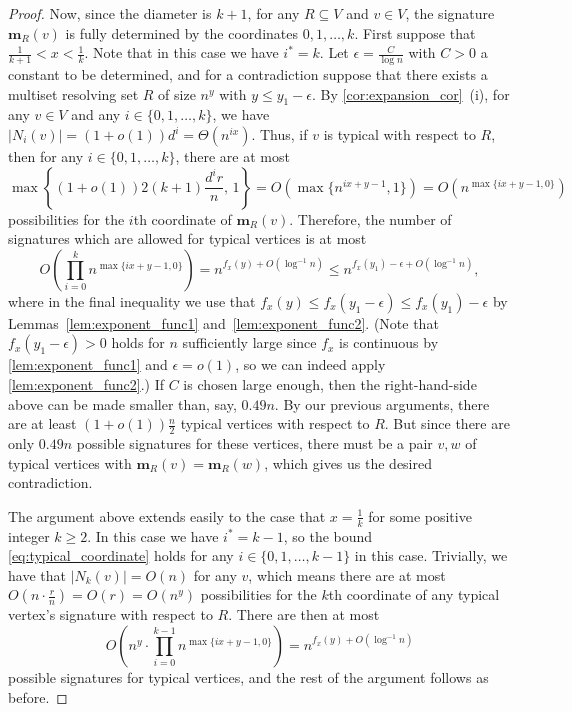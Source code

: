 \documentclass[12pt]{article}
\theoremstyle{definition}
\theoremstyle{remark}
\theoremstyle{remark}
\numberwithin{theorem}{section}
\begin{document}
\begin{proof}
Now, since the diameter is $k+1$, for any $R \subseteq V$ and $v \in V$, the signature $\bm{m}_{R}(v)$ is fully determined by the coordinates $0,1,\dots,k$. First suppose that $\frac{1}{k+1} < x < \frac{1}{k}$. Note that in this case we have $i^{*} = k$. Let $\epsilon = \frac{C}{\log n}$ with $C>0$ a constant to be determined, and for a contradiction suppose that there exists a multiset resolving set $R$ of size $n^{y}$ with $y \leq y_{1} - \epsilon$. By \cref{cor:expansion_cor}~(i), for any $v \in V$ and any $i \in \{ 0,1,\dots,k \}$, we have $|N_{i}(v)| = (1+o(1))d^{i} = \Theta(n^{ix}).$ Thus, if $v$ is typical with respect to $R$, then for any $i \in \{ 0,1,\dots,k \}$, there are at most
\begin{equation}\label{eq:typical_coordinate}
	\max\left\{(1+o(1))2(k+1)\frac{d^{i}r}{n},\,1 \right\} = O\left(\max\{n^{ix +y - 1}, 1\} \right) =O\left(n^{\max\{ix+y-1,0\}} \right)
\end{equation}
possibilities for the $i$th coordinate of $\bm{m}_{R}(v)$. Therefore, the number of signatures which are allowed for typical vertices is at most
$$
	O\left(\prod_{i=0}^{k}n^{\max\{ix+y-1,0\}}\right)= n^{f_{x}(y) + O(\log^{-1}n)} \leq n^{f_{x}(y_{1}) - \epsilon + O(\log^{-1}n)},
$$
where in the final inequality we use that $f_{x}(y) \leq f_{x}(y_{1} - \epsilon) \leq f_{x}(y_{1}) - \epsilon$ by Lemmas~\ref{lem:exponent_func1} and~\ref{lem:exponent_func2}. (Note that $f_{x}(y_{1} - \epsilon) > 0$ holds for $n$ sufficiently large since $f_{x}$ is continuous by \cref{lem:exponent_func1} and $\epsilon = o(1)$, so we can indeed apply \cref{lem:exponent_func2}.) If $C$ is chosen large enough, then the right-hand-side above can be made smaller than, say, $0.49n$. By our previous arguments, there are at least $(1+o(1))\frac{n}{2}$ typical vertices with respect to $R$. But since there are only $0.49n$ possible signatures for these vertices, there must be a pair $v,w$ of typical vertices with $\bm{m}_{R}(v) = \bm{m}_{R}(w)$, which gives us the desired contradiction.

The argument above extends easily to the case that $x = \frac{1}{k}$ for some positive integer $k \ge 2$. In this case we have $i^{*} = k-1$, so the bound \eqref{eq:typical_coordinate} holds for any $i \in \{ 0,1,\dots,k-1 \}$ in this case. Trivially, we have that $|N_{k}(v)| = O(n)$ for any $v$, which means there are at most $O\left(n\cdot\frac{r}{n}\right) = O(r) = O(n^{y})$ possibilities for the $k$th coordinate of any typical vertex's signature with respect to $R$. There are then at most 
$$
	O\left( n^{y}\cdot \prod_{i=0}^{k-1}n^{\max\{ix+y-1,0\}} \right) = n^{f_{x}(y) + O(\log^{-1}n)}
$$
possible signatures for typical vertices, and the rest of the argument follows as before.
\end{proof}
\end{document}
